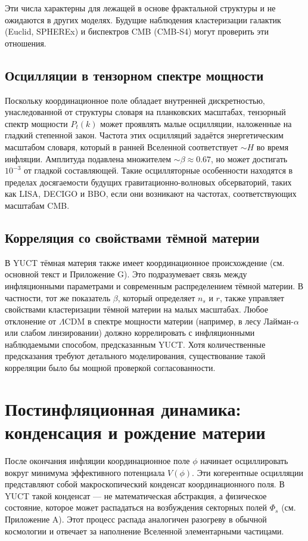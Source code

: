 \documentclass[11pt,a4paper]{article}
\begin{document}
	Эти числа характерны для лежащей в основе фрактальной структуры и не ожидаются в других моделях. Будущие наблюдения кластеризации галактик (Euclid, SPHEREx) и биспектров CMB (CMB‑S4) могут проверить эти отношения.
	
	\subsection{Осцилляции в тензорном спектре мощности}
	
	Поскольку координационное поле обладает внутренней дискретностью, унаследованной от структуры словаря на планковских масштабах, тензорный спектр мощности \(P_t(k)\) может проявлять малые осцилляции, наложенные на гладкий степенной закон. Частота этих осцилляций задаётся энергетическим масштабом словаря, который в ранней Вселенной соответствует \(\sim H\) во время инфляции. Амплитуда подавлена множителем \(\sim \beta \approx 0.67\), но может достигать \(10^{-3}\) от гладкой составляющей. Такие осцилляторные особенности находятся в пределах досягаемости будущих гравитационно-волновых обсерваторий, таких как LISA, DECIGO и BBO, если они возникают на частотах, соответствующих масштабам CMB.
	
	\subsection{Корреляция со свойствами тёмной материи}
	
	В YUCT тёмная материя также имеет координационное происхождение (см. основной текст и Приложение G). Это подразумевает связь между инфляционными параметрами и современным распределением тёмной материи. В частности, тот же показатель \(\beta\), который определяет \(n_s\) и \(r\), также управляет свойствами кластеризации тёмной материи на малых масштабах. Любое отклонение от \(\Lambda\)CDM в спектре мощности материи (например, в лесу Лайман-\(\alpha\) или слабом линзировании) должно коррелировать с инфляционными наблюдаемыми способом, предсказанным YUCT. Хотя количественные предсказания требуют детального моделирования, существование такой корреляции было бы мощной проверкой согласованности.
	
	\section{Постинфляционная динамика: конденсация и рождение материи}
	\label{sec:postinflation}
	
	После окончания инфляции координационное поле \(\phi\) начинает осциллировать вокруг минимума эффективного потенциала \(V(\phi)\). Эти когерентные осцилляции представляют собой макроскопический конденсат координационного поля. В YUCT такой конденсат — не математическая абстракция, а физическое состояние, которое может распадаться на возбуждения секторных полей \(\Phi_s\) (см. Приложение A). Этот процесс распада аналогичен разогреву в обычной космологии и отвечает за наполнение Вселенной элементарными частицами.
	
\end{document}
